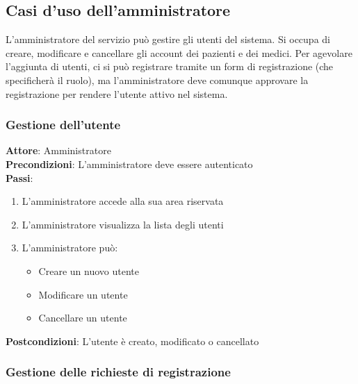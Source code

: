 \documentclass[a4paper]{article}
\begin{document}
\subsection{Casi d'uso dell'amministratore}

L'amministratore del servizio può gestire gli utenti del sistema. Si occupa di creare, modificare e cancellare
gli account dei pazienti e dei medici. Per agevolare l'aggiunta di utenti, ci si può registrare
tramite un form di registrazione (che specificherà il ruolo), ma l'amministratore deve comunque
approvare la registrazione per rendere l'utente attivo nel sistema.

\subsubsection{Gestione dell'utente}

\begin{mdframed}
	\textbf{Attore}: Amministratore\\
	\textbf{Precondizioni}: L'amministratore deve essere autenticato\\
	\textbf{Passi}: 
	\begin{enumerate}[nosep]
	  \item L'amministratore accede alla sua area riservata
	  \item L'amministratore visualizza la lista degli utenti
	  \item L'amministratore può:
	  \begin{itemize}
		  \item  Creare un nuovo utente
		  \item  Modificare un utente
		  \item  Cancellare un utente
	  \end{itemize}
	\end{enumerate}
	\textbf{Postcondizioni}: L'utente è creato, modificato o cancellato
  \end{mdframed}

\subsubsection{Gestione delle richieste di registrazione}
\end{document}
